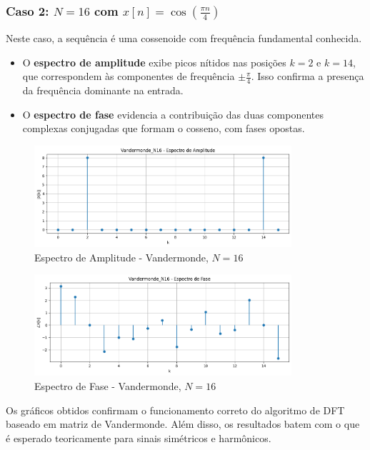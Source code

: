 \documentclass[12pt]{article}
\begin{document}
\subsubsection{Caso 2: $N = 16$ com $x[n] = \cos\left( \frac{\pi n}{4} \right)$}

Neste caso, a sequência é uma cossenoide com frequência fundamental conhecida.

\begin{itemize}
    \item O \textbf{espectro de amplitude} exibe picos nítidos nas posições $k=2$ e $k=14$, que correspondem às componentes de frequência $\pm\frac{\pi}{4}$. Isso confirma a presença da frequência dominante na entrada.
    \item O \textbf{espectro de fase} evidencia a contribuição das duas componentes complexas conjugadas que formam o cosseno, com fases opostas.
\end{itemize}

\begin{figure}[H]
    \centering
    \includegraphics[width=0.85\textwidth]{imagens/Vandermonde_N16_amplitude.png}
    \caption{Espectro de Amplitude - Vandermonde, $N=16$}
\end{figure}

\begin{figure}[H]
    \centering
    \includegraphics[width=0.85\textwidth]{imagens/Vandermonde_N16_fase.png}
    \caption{Espectro de Fase - Vandermonde, $N=16$}
\end{figure}

Os gráficos obtidos confirmam o funcionamento correto do algoritmo de DFT baseado em matriz de Vandermonde. Além disso, os resultados batem com o que é esperado teoricamente para sinais simétricos e harmônicos.
\end{document}

